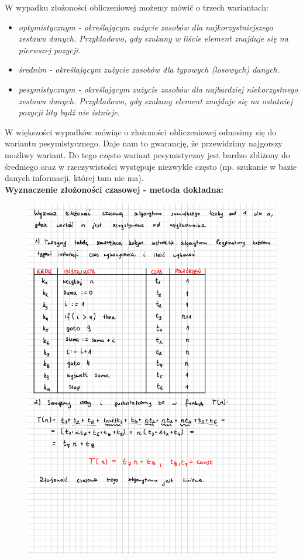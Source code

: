 \documentclass[a4paper,12pt]{article}
\newcommand{\h}[1]{\noindent \bf #1 \rm \\ \noindent}
\newcommand{\italic}[1]{\it #1 \rm}
\begin{document}
\noindent
W wypadku złożoności obliczeniowej możemy mówić o trzech wariantach:
\begin{itemize}
	\item \italic{optymistycznym} - określającym zużycie zasobów dla najkorzystniejszego zestawu danych. Przykładowo, gdy szukany w liście element znajduje się na pierwszej pozycji.
	
	\item \italic{średnim} - określającym zużycie zasobów dla typowych (losowych) danych.
	
	\item \italic{pesymistycznym} - określającym zużycie zasobów dla najbardziej niekorzystnego zestawu danych. Przykładowo, gdy szukany element znajduje się na ostatniej pozycji lity bądź nie istnieje.
\end{itemize}

\noindent
W większości wypadków mówiąc o złożoności obliczeniowej odnosimy się do wariantu pesymistycznego. Daje nam to gwarancję, że przewidzimy najgorszy możliwy wariant. Do tego często wariant pesymistyczny jest bardzo zbliżony do średniego oraz w rzeczywistości występuje niezwykle często (np. szukanie w bazie danych informacji, której tam nie ma).\\

\newpage
\h{Wyznaczenie złożoności czasowej - metoda dokładna:}
\begin{figure}[H]
	\centering
	\includegraphics[width=13cm]{zlozonosc.png}
\end{figure}
\end{document}
